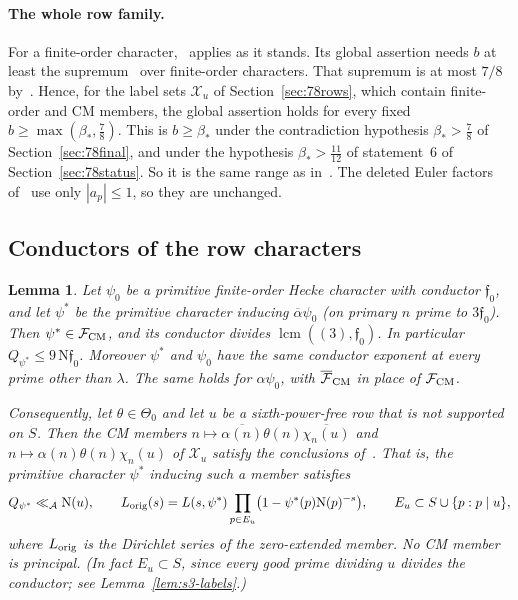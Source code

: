 \documentclass[11pt]{article}
\numberwithin{equation}{section}
\newcommand{\N}{\mathrm N}
\newtheorem{lemma}{Lemma}
\begin{document}
\paragraph{The whole row family.} For a finite-order character,~\cite[Lemma~4.9]{OAI78}
applies as it stands. Its global assertion needs $b$ at least the supremum~\cite[eq.~(2.1)]{OAI78} over
finite-order characters. That supremum is at most $7/8$ by~\cite[Theorem~1.1]{OAI78}. Hence, for the label
sets $\mathcal X_u$ of Section~\ref{sec:78rows}, which contain finite-order and CM members, the global assertion
holds for every fixed $b\ge\max(\beta_*,\frac78)$. This is $b\ge\beta_*$ under the contradiction hypothesis
$\beta_*>\frac78$ of Section~\ref{sec:78final}, and under the hypothesis $\beta_*>\frac{11}{12}$ of statement~6 of
Section~\ref{sec:78status}. So it is the same range as in~\cite{OAI78}. The deleted Euler factors
of~\cite[Lemma~4.10]{OAI78} use only $|a_p|\le1$, so they are unchanged.

\subsection{Conductors of the row characters}\label{sec:s2-cond}
\begin{lemma}\label{lem:s2-rowcond}
Let $\psi_0$ be a primitive finite-order Hecke character with conductor $\mathfrak f_0$, and let $\psi^*$ be the
primitive character inducing $\overline\alpha\psi_0$ (on primary $n$ prime to $3\mathfrak f_0$). Then
$\psi^*\in\mathcal F_{\rm CM}$, and its conductor divides $\operatorname{lcm}((3),\mathfrak f_0)$. In particular
$Q_{\psi^*}\le9\,\N\mathfrak f_0$. Moreover $\psi^*$ and $\psi_0$ have the same conductor exponent at every prime
other than $\lambda$. The same holds for $\alpha\psi_0$, with $\overline{\mathcal F}_{\rm CM}$ in place of
$\mathcal F_{\rm CM}$.

Consequently, let $\theta\in\Theta_0$ and let $u$ be a sixth-power-free row that is not supported on $S$. Then
the CM members $n\mapsto\overline{\alpha(n)}\theta(n)\overline{\chi_n(u)}$ and $n\mapsto\alpha(n)\theta(n)\chi_n(u)$ of
$\mathcal X_u$ satisfy the conclusions of~\cite[Section~8.1]{OAI78}. That is, the primitive character $\psi^*$
inducing such a member satisfies
\begin{equation}\label{eq:d159}
 Q_{\psi^*}\ll_{\mathcal A}\N(u),\qquad
 L_{\rm orig}(s)=L(s,\psi^*)\prod_{p\in E_u}\bigl(1-\psi^*(p)\N(p)^{-s}\bigr),\qquad E_u\subset S\cup\{p:p\mid u\},
\end{equation}
where $L_{\rm orig}$ is the Dirichlet series of the zero-extended member. No CM member is principal.
(In fact $E_u\subset S$, since every good prime dividing $u$ divides the conductor; see
Lemma~\ref{lem:s3-labels}.)
\end{lemma}
\end{document}
